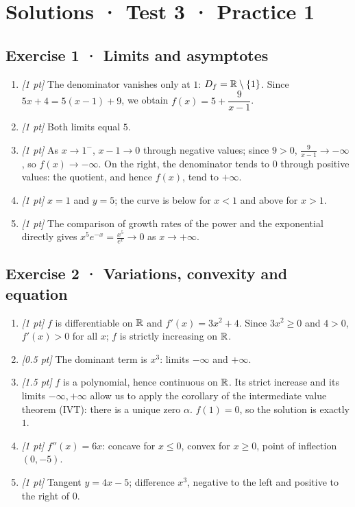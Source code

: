 \ifprof\clearpage

\section*{Solutions · Test 3 · Practice 1}\label{cor:4-1}

\subsection*{Exercise 1 · Limits and asymptotes}\begin{enumerate}

\item \textit{[1 pt]} The denominator vanishes only at $1$: $D_f=\mathbb R\setminus\{1\}$. Since $5x+4=5(x-1)+9$, we obtain $f(x)=5+\dfrac{9}{x-1}$.

\item \textit{[1 pt]} Both limits equal $5$.

\item \textit{[1 pt]} As $x\to 1^-$, $x-1\to0$ through negative values; since $9>0$, $\frac{9}{x-1}\to-\infty$, so $f(x)\to-\infty$. On the right, the denominator tends to $0$ through positive values: the quotient, and hence $f(x)$, tend to $+\infty$.

\item \textit{[1 pt]} $x=1$ and $y=5$; the curve is below for $x<1$ and above for $x>1$.

\item \textit{[1 pt]} The comparison of growth rates of the power and the exponential directly gives $x^5e^{-x}=\frac{x^5}{e^x}\to0$ as $x\to+\infty$.

\end{enumerate}

\subsection*{Exercise 2 · Variations, convexity and equation}\begin{enumerate}

\item \textit{[1 pt]} $f$ is differentiable on $\mathbb R$ and $f'(x)=3x^2+4$. Since $3x^2\ge0$ and $4>0$, $f'(x)>0$ for all $x$; $f$ is strictly increasing on $\mathbb R$.

\item \textit{[0.5 pt]} The dominant term is $x^3$: limits $-\infty$ and $+\infty$.

\item \textit{[1.5 pt]} $f$ is a polynomial, hence continuous on $\mathbb R$. Its strict increase and its limits $-\infty,+\infty$ allow us to apply the corollary of the intermediate value theorem (IVT): there is a unique zero $\alpha$. $f(1)=0$, so the solution is exactly $1$.

\item \textit{[1 pt]} $f''(x)=6x$: concave for $x\le0$, convex for $x\ge0$, point of inflection $(0,-5)$.

\item \textit{[1 pt]} Tangent $y=4x-5$; difference $x^3$, negative to the left and positive to the right of $0$.

\end{enumerate}

